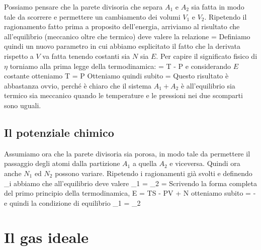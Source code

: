 Possiamo pensare che la parete divisoria che separa $A_{1}$ e $A_{2}$ sia fatta in modo tale da scorrere e permettere un cambiamento dei volumi $V_{1}$ e $V_{2}$. Ripetendo il ragionamento fatto prima a proposito dell'energia, arriviamo al risultato che all'equilibrio (meccanico oltre che termico) deve valere la relazione
\be
\label{eq:02-omegavolume}
 = 
\ee
Definiamo quindi un nuovo parametro
\be
\eta \equiv {}
\ee
in cui abbiamo esplicitato il fatto che la derivata rispetto a $V$ va fatta tenendo costanti sia $N$ sia $E$. Per capire il significato fisico di $\eta$ torniamo alla prima legge della termodinamica:
\be
{} = T - P
\ee
e considerando $E$ costante otteniamo
\be
T = P
\ee
Otteniamo quindi subito
\be
\label{eq:02-eta}
\eta = 
\ee
Questo risultato è abbastanza ovvio, perché è chiaro che il sistema $A_{1}+A_{2}$ è all'equilibrio sia termico sia meccanico quando le temperature e le pressioni nei due scomparti sono uguali.

\subsection{Il potenziale chimico}

Assumiamo ora che la parete divisoria sia porosa, in modo tale da permettere il passaggio degli atomi dalla partizione $A_1$ a quella $A_2$ e viceversa. Quindi ora anche $N_1$ ed $N_2$ possono variare. Ripetendo i ragionamenti già svolti e definendo
\be
\zeta_i \equiv {}
\ee
abbiamo che all'equilibrio deve valere
\be
\zeta_1 = \zeta_2 = \zeta
\ee
Scrivendo la forma completa del primo principio della termodinamica,
\be
\de E = T\de S - P\de V + \mu\de N
\ee
otteniamo subito
\be
\zeta = -
\ee
e quindi la condizione di equilibrio
\be
\mu_1 = \mu_2
\ee

\section{Il gas ideale}
\label{sec:02-gas-ideale}

